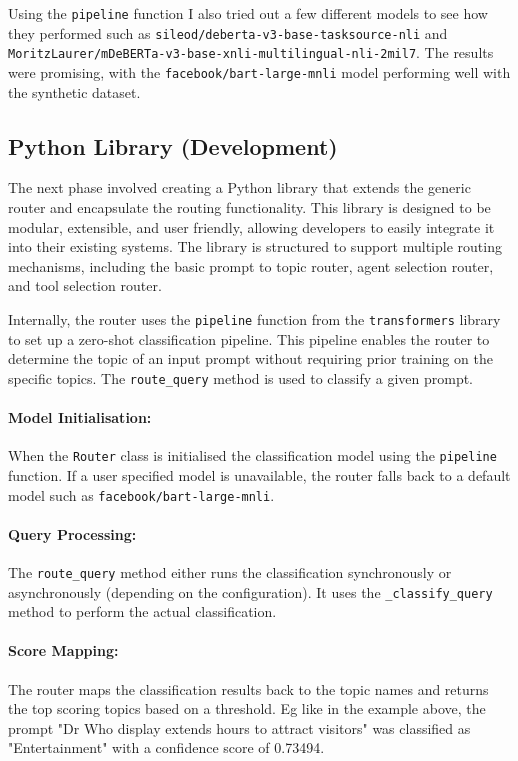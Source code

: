 Using the \texttt{pipeline} function I also tried out a few different models to see how they performed such as \texttt{sileod/deberta-v3-base-tasksource-nli} and 
 \texttt{MoritzLaurer/\newline mDeBERTa-v3-base-xnli-multilingual-nli-2mil7}. The results were promising, with the \texttt{facebook/bart-large-mnli} model performing well with the synthetic dataset.


\subsection{Python Library
(Development)}\label{python library development}



The next phase involved creating a Python library that extends the generic router and encapsulate the routing functionality. This library is designed to be modular, extensible, and user friendly, allowing developers to easily integrate
it into their existing systems. The library is structured to support
multiple routing mechanisms, including the basic prompt to topic router,
agent selection router, and tool selection router.


Internally, the router uses the \texttt{pipeline} function from the \texttt{transformers} library to set up a zero-shot classification pipeline. This pipeline enables the router to determine the topic of an input prompt without requiring prior training on the specific topics. The \texttt{route\_query} method is used to classify a given prompt.

\paragraph{Model Initialisation:} When the \texttt{Router} class is initialised the classification model using the \texttt{pipeline} function. If a user specified model is unavailable, the router falls back to a default model such as \texttt{facebook/bart-large-mnli}.

\paragraph{Query Processing:} The \texttt{route\_query} method either runs the classification synchronously or asynchronously (depending on the configuration). It uses the \texttt{\_classify\_query} method to perform the actual classification.

\paragraph{Score Mapping:} The router maps the classification results back to the topic names and returns the top scoring topics based on a threshold. Eg like in the example above, the prompt "Dr Who display extends hours to attract visitors" was classified as "Entertainment" with a confidence score of 0.73494.

